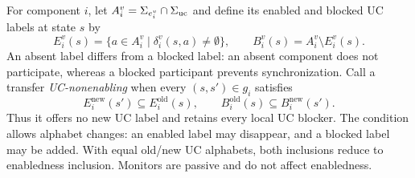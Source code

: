 For component $i$, let $A_i^v=\Sigma_{e_i^v}\cap\Sigma_{\mathrm{uc}}$ and define its enabled and blocked UC labels at state $s$ by
\[
 E_i^v(s)=\{a\in A_i^v\mid\delta_i^v(s,a)\ne\emptyset\},\qquad
 B_i^v(s)=A_i^v\setminus E_i^v(s).
\]
An absent label differs from a blocked label: an absent component does not participate, whereas a blocked participant prevents synchronization. Call a transfer \emph{UC-nonenabling} when every $(s,s')\in g_i$ satisfies
\begin{equation}\label{eq:local-uc-criterion}
 E_i^{\mathrm{new}}(s')\subseteq E_i^{\mathrm{old}}(s),\qquad
 B_i^{\mathrm{old}}(s)\subseteq B_i^{\mathrm{new}}(s').
\end{equation}
Thus it offers no new UC label and retains every local UC blocker. The condition allows alphabet changes: an enabled label may disappear, and a blocked label may be added. With equal old/new UC alphabets, both inclusions reduce to enabledness inclusion. Monitors are passive and do not affect enabledness.

